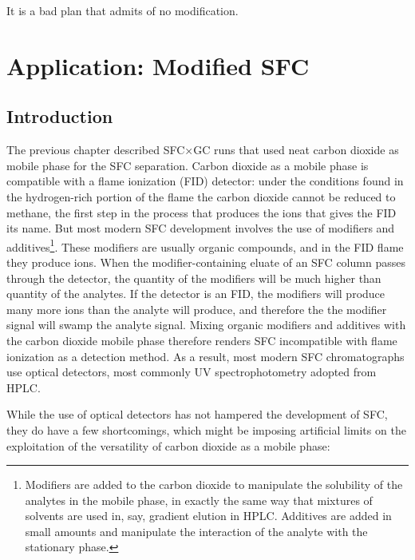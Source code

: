 
\begin{savequote}[\quotewidth]
It is a bad plan that admits of no modification.
\end{savequote}

\chapter{Application: Modified SFC} %

\label{Chapter7} %

\section{Introduction}

The previous chapter described SFC×GC runs that used neat carbon dioxide as
mobile phase for the SFC separation. Carbon dioxide as a mobile phase is
compatible with a flame ionization (FID) detector: under the conditions found in
the hydrogen-rich portion of the flame the carbon dioxide cannot be reduced to
methane, the first step in the process that produces the ions that gives the FID
its name. But most modern SFC development involves the use of modifiers and
additives\footnote{Modifiers are added to the carbon dioxide to manipulate the
solubility of the analytes in the mobile phase, in exactly the same way that
mixtures of solvents are used in, say, gradient elution in HPLC. Additives are
added in small amounts and manipulate the interaction of the analyte with the
stationary phase.}. These modifiers are usually organic compounds, and in the
FID flame they produce ions. When the modifier-containing eluate of an SFC
column passes through the detector, the quantity of the modifiers will be much
higher than quantity of the analytes. If the detector is an FID, the modifiers
will produce many more ions than the analyte will produce, and therefore the the
modifier signal will swamp the analyte signal. Mixing organic modifiers and
additives with the carbon dioxide mobile phase therefore renders SFC
incompatible with flame ionization as a detection method. As a result, most
modern SFC chromatographs use optical detectors, most commonly UV
spectrophotometry adopted from HPLC.

While the use of optical detectors has not hampered the development of SFC,
they do have a few shortcomings, which might be imposing artificial limits on
the exploitation of the versatility of carbon dioxide as a mobile phase:

